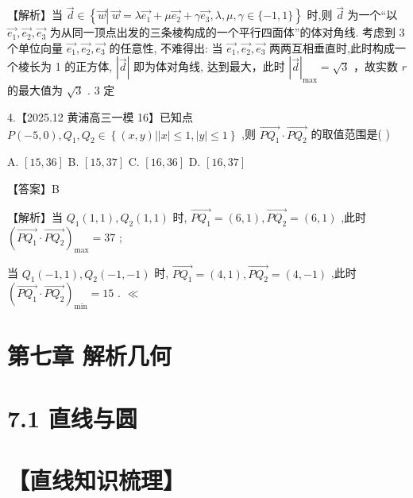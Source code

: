 \documentclass[10pt]{article}
\begin{document}
【解析】当 \(\overrightarrow{d} \in  \left\{  {\overrightarrow{w}\left| {\;\overrightarrow{w} = \lambda \overrightarrow{{e}_{1}} + \mu \overrightarrow{{e}_{2}} + \gamma \overrightarrow{{e}_{3}}}\right. ,\lambda ,\mu ,\gamma  \in  \{  - 1,1\} }\right\}\) 时,则 \(\overrightarrow{d}\) 为一个“以 \(\overrightarrow{{e}_{1}},\overrightarrow{{e}_{2}},\overrightarrow{{e}_{3}}\) 为从同一顶点出发的三条棱构成的一个平行四面体”的体对角线. 考虑到 3 个单位向量 \(\overrightarrow{{e}_{1}},\overrightarrow{{e}_{2}},\overrightarrow{{e}_{3}}\) 的任意性, 不难得出: 当 \(\overrightarrow{{e}_{1}},\overrightarrow{{e}_{2}},\overrightarrow{{e}_{3}}\) 两两互相垂直时,此时构成一个棱长为 1 的正方体, \(\left| \overrightarrow{d}\right|\) 即为体对角线, 达到最大，此时 \({\left| \overrightarrow{d}\right| }_{\max } = \sqrt{3}\) ，故实数 \(r\) 的最大值为 \(\sqrt{3}\) . 3 定

4.【2025.12 黄浦高三一模 16】已知点 \(P\left( {-5,0}\right) ,{Q}_{1},{Q}_{2} \in  \left\{  {\left( {x,y}\right) \left| \right| x\left| { \leq  1,}\right| y \mid   \leq  1}\right\}\) ,则 \(\overrightarrow{P{Q}_{1}} \cdot  \overrightarrow{P{Q}_{2}}\) 的取值范围是( )

A. \(\left\lbrack  {{15},{36}}\right\rbrack\) B. \(\left\lbrack  {{15},{37}}\right\rbrack\) C. \(\left\lbrack  {{16},{36}}\right\rbrack\) D. \(\left\lbrack  {{16},{37}}\right\rbrack\)

【答案】B

【解析】当 \({Q}_{1}\left( {1,1}\right) ,{Q}_{2}\left( {1,1}\right)\) 时, \(\overrightarrow{P{Q}_{1}} = \left( {6,1}\right) ,\overrightarrow{P{Q}_{2}} = \left( {6,1}\right)\) ,此时 \({\left( \overrightarrow{P{Q}_{1}} \cdot  \overrightarrow{P{Q}_{2}}\right) }_{\max } = {37}\) ;

当 \({Q}_{1}\left( {-1,1}\right) ,{Q}_{2}\left( {-1, - 1}\right)\) 时, \(\overrightarrow{P{Q}_{1}} = \left( {4,1}\right) ,\overrightarrow{P{Q}_{2}} = \left( {4, - 1}\right)\) ,此时 \({\left( \overrightarrow{P{Q}_{1}} \cdot  \overrightarrow{P{Q}_{2}}\right) }_{\min } = {15}\) . \(\ll\)

\section*{第七章 解析几何}

\section*{7.1 直线与圆}

\section*{【直线知识梳理】}
\end{document}
